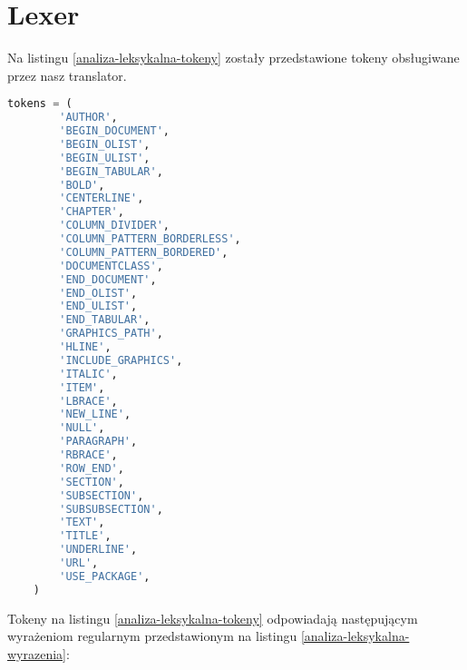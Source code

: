 \section{Lexer}
Na listingu \ref{analiza-leksykalna-tokeny} zostały przedstawione tokeny obsługiwane przez nasz translator.

\begin{lstlisting}[language={Python}, caption={Tokeny}, label={analiza-leksykalna-tokeny}]
    tokens = (
        'AUTHOR',
        'BEGIN_DOCUMENT',
        'BEGIN_OLIST',
        'BEGIN_ULIST',
        'BEGIN_TABULAR',
        'BOLD',
        'CENTERLINE',
        'CHAPTER',
        'COLUMN_DIVIDER',
        'COLUMN_PATTERN_BORDERLESS',
        'COLUMN_PATTERN_BORDERED',
        'DOCUMENTCLASS',
        'END_DOCUMENT',
        'END_OLIST',
        'END_ULIST',
        'END_TABULAR',
        'GRAPHICS_PATH',
        'HLINE',
        'INCLUDE_GRAPHICS',
        'ITALIC',
        'ITEM',
        'LBRACE',
        'NEW_LINE',
        'NULL',
        'PARAGRAPH',
        'RBRACE',
        'ROW_END',
        'SECTION',
        'SUBSECTION',
        'SUBSUBSECTION',
        'TEXT',
        'TITLE',
        'UNDERLINE',
        'URL',
        'USE_PACKAGE',
    )
\end{lstlisting}

Tokeny na listingu \ref{analiza-leksykalna-tokeny} odpowiadają następującym wyrażeniom regularnym 
przedstawionym na listingu \ref{analiza-leksykalna-wyrazenia}:

